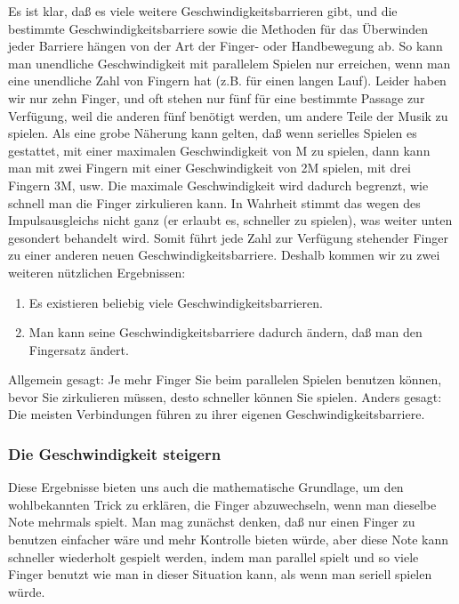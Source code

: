 Es ist klar, daß es viele weitere Geschwindigkeitsbarrieren gibt, und die bestimmte Geschwindigkeitsbarriere sowie die Methoden für das Überwinden jeder Barriere hängen von der Art der Finger- oder Handbewegung ab.
So kann man unendliche Geschwindigkeit mit parallelem Spielen nur erreichen, wenn man eine unendliche Zahl von Fingern hat (z.B. für einen langen Lauf).
Leider haben wir nur zehn Finger, und oft stehen nur fünf für eine bestimmte Passage zur Verfügung, weil die anderen fünf benötigt werden, um andere Teile der Musik zu spielen.
Als eine grobe Näherung kann gelten, daß wenn serielles Spielen es gestattet, mit einer maximalen Geschwindigkeit von M zu spielen, dann kann man mit zwei Fingern mit einer Geschwindigkeit von 2M spielen, mit drei Fingern 3M, usw.
Die maximale Geschwindigkeit wird dadurch begrenzt, wie schnell man die Finger zirkulieren kann.
In Wahrheit stimmt das wegen des Impulsausgleichs nicht ganz (er erlaubt es, schneller zu spielen), was weiter unten gesondert behandelt wird.
Somit führt jede Zahl zur Verfügung stehender Finger zu einer anderen neuen Geschwindigkeitsbarriere.
Deshalb kommen wir zu zwei weiteren nützlichen Ergebnissen: 

\begin{enumerate} 
 \item Es existieren beliebig viele Geschwindigkeitsbarrieren.
 \item Man kann seine Geschwindigkeitsbarriere dadurch ändern, daß man den Fingersatz ändert.
\end{enumerate}

Allgemein gesagt: Je mehr Finger Sie beim parallelen Spielen benutzen können, bevor Sie zirkulieren müssen, desto schneller können Sie spielen.
Anders gesagt: Die meisten Verbindungen führen zu ihrer eigenen Geschwindigkeitsbarriere.


\subsubsection{Die Geschwindigkeit steigern}
\label{c1iv2c}

Diese Ergebnisse bieten uns auch die mathematische Grundlage, um den wohlbekannten Trick zu erklären, die Finger abzuwechseln, wenn man dieselbe Note mehrmals spielt.
Man mag zunächst denken, daß nur einen Finger zu benutzen einfacher wäre und mehr Kontrolle bieten würde, aber diese Note kann schneller wiederholt gespielt werden, indem man parallel spielt und so viele Finger benutzt wie man in dieser Situation kann, als wenn man seriell spielen würde.

